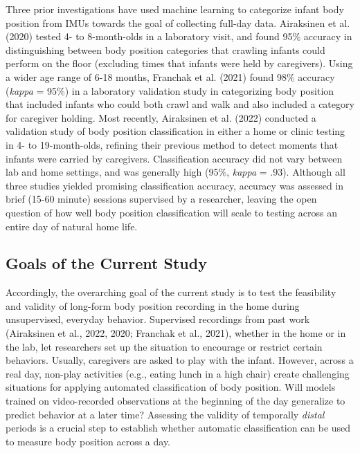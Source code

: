 \documentclass[
  man]{apa6}
\begin{document}
Three prior investigations have used machine learning to categorize infant body position from IMUs towards the goal of collecting full-day data. Airaksinen et al. (2020) tested 4- to 8-month-olds in a laboratory visit, and found 95\% accuracy in distinguishing between body position categories that crawling infants could perform on the floor (excluding times that infants were held by caregivers). Using a wider age range of 6-18 months, Franchak et al. (2021) found 98\% accuracy (\emph{kappa} = 95\%) in a laboratory validation study in categorizing body position that included infants who could both crawl and walk and also included a category for caregiver holding. Most recently, Airaksinen et al. (2022) conducted a validation study of body position classification in either a home or clinic testing in 4- to 19-month-olds, refining their previous method to detect moments that infants were carried by caregivers. Classification accuracy did not vary between lab and home settings, and was generally high (95\%, \emph{kappa} = .93). Although all three studies yielded promising classification accuracy, accuracy was assessed in brief (15-60 minute) sessions supervised by a researcher, leaving the open question of how well body position classification will scale to testing across an entire day of natural home life.

\hypertarget{goals-of-the-current-study}{%
\subsection{Goals of the Current Study}\label{goals-of-the-current-study}}

Accordingly, the overarching goal of the current study is to test the feasibility and validity of long-form body position recording in the home during unsupervised, everyday behavior. Supervised recordings from past work (Airaksinen et al., 2022, 2020; Franchak et al., 2021), whether in the home or in the lab, let researchers set up the situation to encourage or restrict certain behaviors. Usually, caregivers are asked to play with the infant. However, across a real day, non-play activities (e.g., eating lunch in a high chair) create challenging situations for applying automated classification of body position. Will models trained on video-recorded observations at the beginning of the day generalize to predict behavior at a later time? Assessing the validity of temporally \emph{distal} periods is a crucial step to establish whether automatic classification can be used to measure body position across a day.
\end{document}

